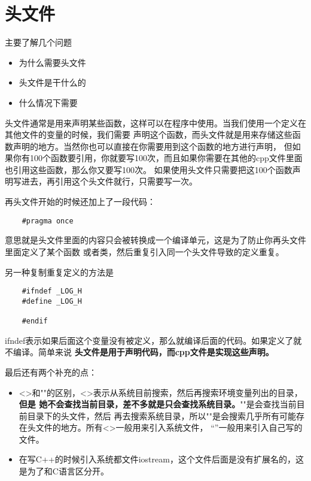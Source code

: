 \documentclass{article}
\begin{document}
\begin{sloppypar}
\section{头文件}
主要了解几个问题
\begin{itemize}
	\item 为什么需要头文件
	\item 头文件是干什么的
	\item 什么情况下需要
\end{itemize}

头文件通常是用来声明某些函数，这样可以在程序中使用。当我们使用一个定义在其他文件的变量的时候，我们需要
声明这个函数，而头文件就是用来存储这些函数声明的地方。当然你也可以直接在你需要用到这个函数的地方进行声明，
但如果你有100个函数要引用，你就要写100次，而且如果你需要在其他的cpp文件里面也引用这些函数，那么你又要写100次。
如果使用头文件只需要把这100个函数声明写进去，再引用这个头文件就行，只需要写一次。	

再头文件开始的时候还加上了一段代码：
\begin{lstlisting}
	#pragma once
\end{lstlisting}
意思就是头文件里面的内容只会被转换成一个编译单元，这是为了防止你再头文件里面定义了某个函数
或者类，然后重复引入同一个头文件导致的定义重复。	

另一种复制重复定义的方法是
\begin{lstlisting}
	#ifndef _LOG_H
	#define _LOG_H

	#endif
\end{lstlisting}
ifndef表示如果后面这个变量没有被定义，那么就编译后面的代码。如果定义了就不编译。简单来说
\textbf{头文件是用于声明代码，而cpp文件是实现这些声明。}

最后还有两个补充的点：
\begin{itemize}
	\item <>和""的区别，<>表示从系统目前搜索，然后再搜索环境变量列出的目录，\textbf{但是
	她不会查找当前目录，差不多就是只会查找系统目录。}""是会查找当前目前目录下的头文件，然后
	再去搜索系统目录，所以""是会搜索几乎所有可能存在头文件的地方。所有<>一般用来引入系统文件，
	“”一般用来引入自己写的文件。
	\item 在写C++的时候引入系统都文件iostream，这个文件后面是没有扩展名的，这是为了和C语言区分开。
\end{itemize}




\end{sloppypar}
\end{document}
